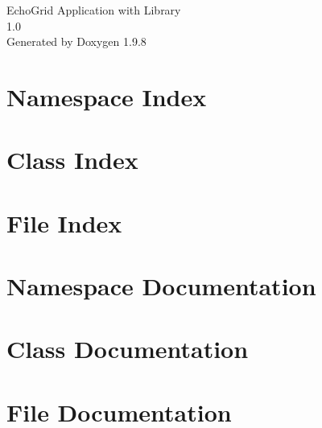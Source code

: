 \documentclass[twoside]{book}
\newcommand{\+}{\discretionary{\mbox{\scriptsize$\hookleftarrow$}}{}{}}
\newcommand{\clearemptydoublepage}{%
    \newpage{\pagestyle{empty}\cleardoublepage}%
  }
\begin{document}
  \raggedbottom
    \hypersetup{pageanchor=false,
                bookmarksnumbered=true,
                pdfencoding=unicode
               }
  \begin{titlepage}
  \vspace*{7cm}
  \begin{center}%
  {\Large Echo\+Grid Application with Library}\\
  [1ex]\large 1.\+0 \\
  \vspace*{1cm}
  {\large Generated by Doxygen 1.9.8}\\
  \end{center}
  \end{titlepage}
  \clearemptydoublepage
  \tableofcontents
  \clearemptydoublepage
  \hypersetup{pageanchor=true}

\chapter{Namespace Index}

\chapter{Class Index}

\chapter{File Index}

\chapter{Namespace Documentation}

\chapter{Class Documentation}

\chapter{File Documentation}





  \backmatter
  \newpage
  \clearemptydoublepage
  \printindex
\end{document}
